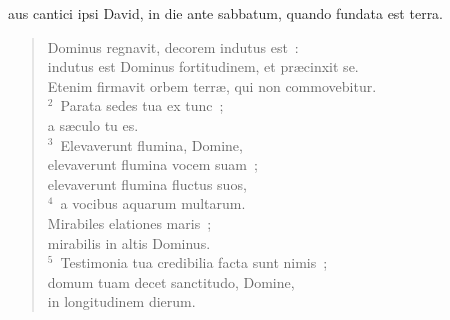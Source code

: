 \bchapter
{}aus cantici ipsi David, in die ante sabbatum, quando fundata est terra. \begin{flushleft}\begin{verse}\vspace{6pt}Dominus regnavit, decorem indutus est~:\\ indutus est Dominus fortitudinem, et pr\ae cinxit se.\\ Etenim firmavit orbem terr\ae , qui non commovebitur.\\
${}^{2}$~Parata sedes tua ex tunc~;\\ a s\ae culo tu es.\\
${}^{3}$~Elevaverunt flumina, Domine,\\ elevaverunt flumina vocem suam~;\\ elevaverunt flumina fluctus suos,\\
${}^{4}$~a vocibus aquarum multarum.\\ Mirabiles elationes maris~;\\ mirabilis in altis Dominus.\\
${}^{5}$~Testimonia tua credibilia facta sunt nimis~;\\ domum tuam decet sanctitudo, Domine,\\ in longitudinem dierum.\end{verse}\end{flushleft}



